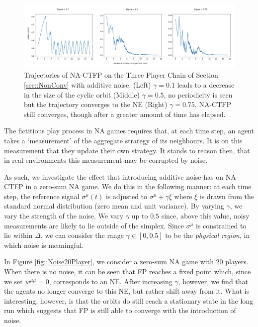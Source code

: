 \documentclass{article}
\theoremstyle{definition}
\newcommand{\refmu}{\sigma^{\mu}}
\begin{document}
  \begin{figure}[t]
    \centering
    \includegraphics[width = \columnwidth]{Figures/3PlayerChainNoise.png}
    \caption{\label{fig::3PlayerChainNoise} Trajectories of NA-CTFP on the Three Player Chain of Section \ref{sec::NonConv} with additive noise. (Left) $\gamma = 0.1$ leads to a decrease in the size of the cyclic orbit (Middle) $\gamma = 0.5$, no periodicity is seen but the trajectory converges to the NE (Right) $\gamma = 0.75$, NA-CTFP still converges, though after a greater amount of time has elapsed.}
  \end{figure}

  The fictitious play process in NA games requires that, at each time step, an agent takes a
  `measurement' of the aggregate strategy of its neighbours. It is on this measurement that they
  update their own strategy. It stands to reason then, that in real environments this measurement
  may be corrupted by noise. 
  
  As such, we investigate the effect that introducing additive noise has
  on NA-CTFP in a zero-sum NA game. We do this in the following manner: at each time step, the
  reference signal $\refmu(t)$ is adjusted to $\refmu + \gamma \xi$ where $\xi$ is drawn from the
  standard normal distribution (zero mean and unit variance). By varying $\gamma$, we vary the
  strength of the noise. We vary $\gamma$ up to $0.5$ since, above this value, noisy measurements
  are likely to lie outside of the simplex. Since $\refmu$ is constrained to lie within $\Delta$, we
  can consider the range $\gamma \in [0, 0.5]$ to be the \emph{physical region}, in which noise is meaningful.

  In Figure \ref{fig::Noise20Player}, we consider a zero-sum NA game with 20 players. When there is
  no noise, it can be seen that FP reaches a fixed point which, since we set $w^{\mu \mu} = 0$,
  corresponds to an NE. After increasing $\gamma$, however, we find that the agents no longer
  converge to this NE, but rather shift away from it. What is interesting, however, is that the
  orbits do still reach a stationary state in the long run which suggests that FP is still able to
  converge with the introduction of noise.
\end{document}
